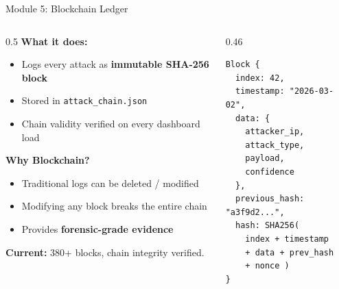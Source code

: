 \documentclass[aspectratio=169,12pt]{beamer}
\begin{document}
\begin{frame}[fragile]{Module 5: Blockchain Ledger}
  \begin{columns}[T]
    \begin{column}{0.5\textwidth}
      \textbf{\textcolor{dcCyan}{What it does:}}
      \begin{itemize}
        \item Logs every attack as \textbf{immutable SHA-256 block}
        \item Stored in \texttt{attack\_chain.json}
        \item Chain validity verified on every dashboard load
      \end{itemize}
      \vspace{0.3em}
      \textbf{\textcolor{dcCyan}{Why Blockchain?}}
      \begin{itemize}
        \item Traditional logs can be deleted / modified
        \item Modifying any block breaks the entire chain
        \item Provides \textbf{forensic-grade evidence}
      \end{itemize}
      \vspace{0.3em}
      \textcolor{dcGreen}{\textbf{Current:}} 380+ blocks, chain integrity verified.
    \end{column}
    \begin{column}{0.46\textwidth}
\begin{lstlisting}
Block {
  index: 42,
  timestamp: "2026-03-02",
  data: {
    attacker_ip,
    attack_type,
    payload,
    confidence
  },
  previous_hash: "a3f9d2...",
  hash: SHA256(
    index + timestamp
    + data + prev_hash
    + nonce )
}
\end{lstlisting}
    \end{column}
  \end{columns}
\end{frame}
\end{document}
